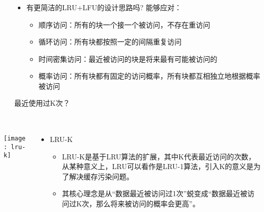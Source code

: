 \begin{frame}[plain]
	\frametitle{ }
	\begin{columns}
		\begin{column}{.1\textwidth}
			\centering
		\end{column}
		
		\begin{column}{.9\textwidth}
			
			\begin{itemize}
				\item 有更简洁的LRU+LFU的设计思路吗? 能够应对：
				\begin{itemize}
					
					\item 顺序访问：所有的块一个接一个被访问，不存在重访问
					\item 循环访问：所有块都按照一定的间隔重复访问
					\item 时间密集访问：最近被访问的块是将来最有可能被访问的
					\item 概率访问：所有块都有固定的访问概率，所有块都互相独立地根据概率被访问
					
					
				\end{itemize}
			\end{itemize}
		\centering
			最近使用过K次？
			
		\end{column}
		
		
	\end{columns}
\end{frame}



\begin{frame}[plain]
	\frametitle{ }
	\begin{columns}
		\begin{column}{.4\textwidth}
			\centering
			\texttt{[image: lru-k]}
		\end{column}
		
		\begin{column}{.6\textwidth}
			
			\begin{itemize}
				\item LRU-K
				\begin{itemize}
					
					\item LRU-K是基于LRU算法的扩展，其中K代表最近访问的次数，从某种意义上，LRU可以看作是LRU-1算法，引入K的意义是为了解决缓存污染问题。
					\item 其核心理念是从“数据最近被访问过1次”蜕变成“数据最近被访问过K次，那么将来被访问的概率会更高”。
					
					
				\end{itemize}
			\end{itemize}
			
			
		\end{column}
		
		
	\end{columns}
\end{frame}


